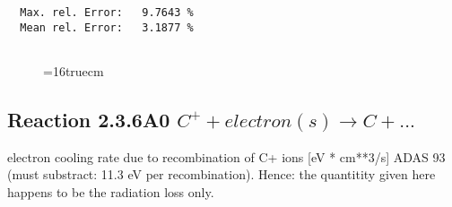 \documentclass[12pt]{article}
\begin{document}
\begin{small}
\begin{verbatim}
  Max. rel. Error:   9.7643 %
  Mean rel. Error:   3.1877 %


\end{verbatim}\end{small}
\begin{figure} \label{2.6il}
\epsfxsize=16truecm
\end{figure}
\newpage

\subsection{
  Reaction 2.3.6A0  $C^+ + electron(s) \rightarrow C   + ... $
}
electron cooling rate due to recombination of C+ ions [eV * cm**3/s]
ADAS 93  (must substract: 11.3 eV per recombination).
Hence: the quantitity given here happens to be the radiation loss only.
\end{document}
